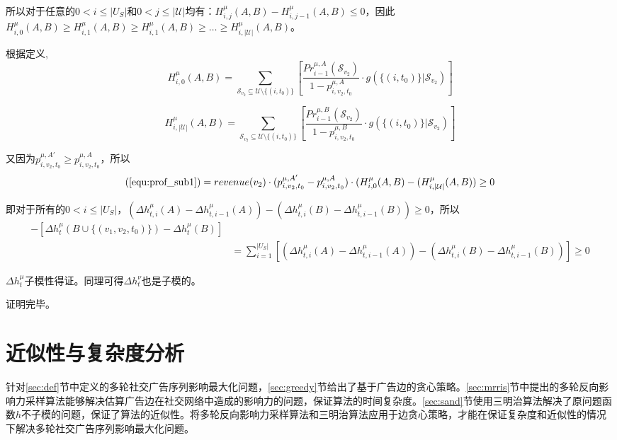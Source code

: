 所以对于任意的$0<i\le |U_S|$和$0<j\le |\mathcal{U}|$均有：$H_{i,j}^{\mu}(A,B)-H_{i,j-1}^{\mu}(A,B) \le 0$，因此$H_{i,0}^{\mu} (A,B)\ge H_{i,1}^{\mu}(A,B) \ge H_{i,1}^{\mu}(A,B) \ge \ldots \ge H_{i,|\mathcal{U}|}^{\mu}(A,B)$。

根据定义,
\begin{equation}
H_{i,0}^{\mu} (A,B)= \sum_{\mathcal{S}_{v_2}\subseteq \mathcal{U}\setminus \{(i,t_0)\}}\left[\frac{Pr_{i-1}^{\mu,A}(\mathcal{S}_{v_2})}{1-p_{i,v_2,t_0}^{\mu,A}} \cdot g(\{(i,t_0)\} |\mathcal{S}_{v_2})\right]
\end{equation}

\begin{equation}
H_{i,|\mathcal{U}|}^{\mu} (A,B)= \sum_{\mathcal{S}_{v_2}\subseteq \mathcal{U}\setminus \{(i,t_0)\}}\left[\frac{Pr_{i-1}^{\mu,B}(\mathcal{S}_{v_2})}{1-p_{i,v_2,t_0}^{\mu,B}} \cdot g(\{(i,t_0)\} |\mathcal{S}_{v_2})\right]
\end{equation}

又因为$p_{i,v_2,t_0}^{\mu,A'}\ge p_{i,v_2,t_0}^{\mu,A}$，所以
\begin{equation}
(\ref{equ:prof_sub1})=revenue(v_2)\cdot (p_{i,v_2,t_0}^{\mu,A'}-p_{i,v_2,t_0}^{\mu,A})\cdot (H_{i,0}^{\mu}(A,B)-(H_{i,|\mathcal{U}|}^{\mu}(A,B)) \ge 0
\end{equation}

即对于所有的$0<i \le |U_S|$，$(\Delta h_{t,i}^{\mu}(A)-\Delta h_{t,i-1}^{\mu}(A)) - (\Delta h_{t,i}^{\mu}(B)-\Delta h_{t,i-1}^{\mu}(B)) \ge 0$，所以
\begin{align}
    [\Delta h_t^\mu(A \cup \{(v_1,v_2,t_0)\}&-\Delta h_t^\mu(A))]- [\Delta h_t^\mu(B\cup \{(v_1,v_2,t_0)\})-\Delta h_t^\mu(B)]\\ 
    &=\sum_{i=1}^{|U_S|}[(\Delta h_{t,i}^{\mu}(A)-\Delta h_{t,i-1}^{\mu}(A)) - (\Delta h_{t,i}^{\mu}(B)-\Delta h_{t,i-1}^{\mu}(B))] \ge 0
\end{align}

$\Delta h_t^\mu$子模性得证。同理可得$\Delta h_t^\nu$也是子模的。

\noindent 证明完毕。

\section{近似性与复杂度分析}
\label{sec:ana}

针对\ref{sec:def}节中定义的多轮社交广告序列影响最大化问题，\ref{sec:greedy}节给出了基于广告边的贪心策略。\ref{sec:mrris}节中提出的多轮反向影响力采样算法能够解决估算广告边在社交网络中造成的影响力的问题，保证算法的时间复杂度。\ref{sec:sand}节使用三明治算法解决了原问题函数$h$不子模的问题，保证了算法的近似性。将多轮反向影响力采样算法和三明治算法应用于边贪心策略，才能在保证复杂度和近似性的情况下解决多轮社交广告序列影响最大化问题。

